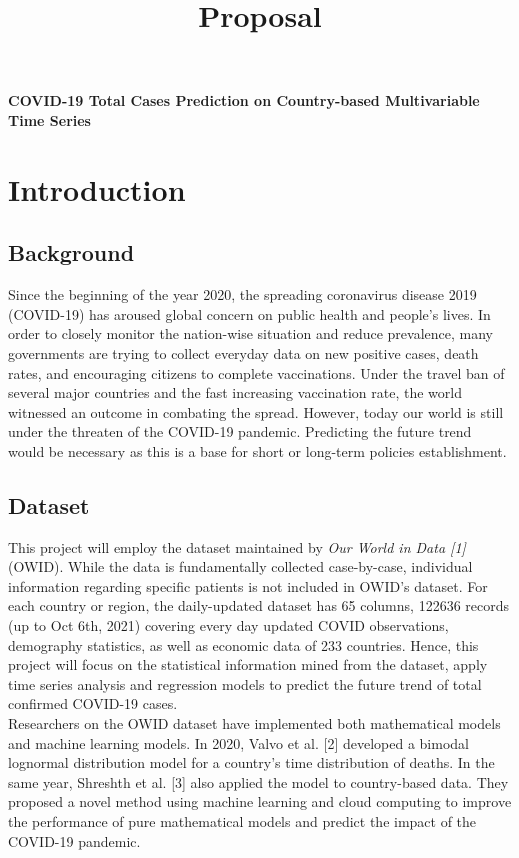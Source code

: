 \documentclass[11pt]{article}
\title{Proposal}
\begin{document}

\begin{center}
	{\LARGE \bf   COVID-19 Total Cases Prediction on Country-based Multivariable Time Series}\\
	\vspace{0.3cm}{Nange Li}
\end{center}

\section{Introduction}
\subsection{Background}
Since the beginning of the year 2020, the spreading coronavirus disease 2019 (COVID-19) has aroused global concern on public health and people's lives. In order to closely monitor the nation-wise situation and reduce prevalence, many governments are trying to collect everyday data on new positive cases, death rates, and encouraging citizens to complete vaccinations. Under the travel ban of several major countries and the fast increasing vaccination rate, the world witnessed an outcome in combating the spread. However, today our world is still under the threaten of the COVID-19 pandemic. Predicting the future trend would be necessary as this is a base for short or long-term policies establishment.

\subsection{Dataset}
This project will employ the dataset maintained by {\em Our World in Data [1]} (OWID). While the data is fundamentally collected case-by-case, individual information regarding specific patients is not included in OWID's dataset. For each country or region, the daily-updated dataset has 65 columns, 122636 records (up to Oct 6th, 2021) covering every day updated COVID observations, demography statistics, as well as economic data of 233 countries.  Hence, this project will focus on the statistical information mined from the dataset, apply time series analysis and regression models to predict the future trend of total confirmed COVID-19 cases. \\

Researchers on the OWID dataset have implemented both mathematical models and machine learning models. In 2020, Valvo et al. [2] developed a bimodal lognormal distribution model for a country's time distribution of deaths. In the same year, Shreshth et al. [3] also applied the model to country-based data.  They proposed a novel method using machine learning and cloud computing to improve the performance of pure mathematical models and predict the impact of the COVID-19 pandemic. 
\end{document}
